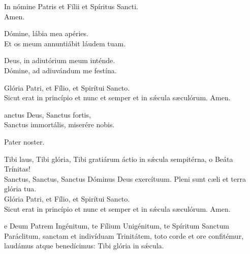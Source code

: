 \va In nómine Patris et Fílii et Spíritus Sancti.\\
\ra Amen.
\smallskip

\va Dómine, lábia mea apéries.\\
\ra Et os meum annuntiábit láudem tuam.
\smallskip

\va Deus, in adiutórium meum inténde.\\
\ra Dómine, ad adiuvándum me festína.
\smallskip

\va Glória Patri, et Fílio, et Spirítui Sancto.\\
\ra Sicut erat in princípio et nunc et semper et in s\'\ae cula s\ae culórum. Amen.\\

{\color{rubrica}{\large PRIMA DECAS}}


 anctus Deus, Sanctus fortis,\\
Sanctus immortális, miserére nobis.
\smallskip

Pater noster.
\smallskip

\va Tibi laus, Tibi glória, Tibi gratiárum áctio in s\'\ae cula sempitérna, o Beáta
Trínitas!\\
\ra Sanctus, Sanctus, Sanctus Dóminus Deus exercítuum. Pleni sunt c\ae li
et terra glória tua.\\

\va Glória Patri, et Fílio, et Spirítui Sancto.\\
\ra Sicut erat in princípio et nunc et semper et in s\'\ae cula s\ae culórum. Amen.

\smallskip


\medskip 

{\color{rubrica}{\large ANTIPHONA}}

 e Deum Patrem Ingénitum, te Fílium Unigénitum, te Spíritum
Sanctum Paráclitum, sanctam et indivíduam Trinitátem, toto
corde et ore confitémur, laudámus atque benedícimus: Tibi
glória in s\'\ae cula.
\smallskip


